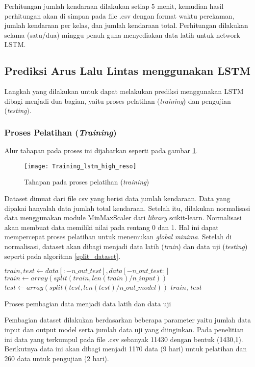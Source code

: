 \documentclass[../thesis.tex]{subfiles}
\begin{document}
Perhitungan jumlah kendaraan dilakukan setiap 5 menit, kemudian hasil perhitungan akan di simpan pada file .csv dengan format waktu perekaman, jumlah kendaraan per kelas, dan jumlah kendaraan total. Perhitungan dilakukan selama (satu/dua) minggu penuh guna menyediakan data latih untuk network LSTM.  

\subsection{Prediksi Arus Lalu Lintas menggunakan LSTM}
Langkah yang dilakukan untuk dapat melakukan prediksi menggunakan LSTM dibagi menjadi dua bagian, yaitu proses pelatihan (\textit{training}) dan pengujian (\textit{testing}).

\subsubsection{Proses Pelatihan (\textit{Training})}
Alur tahapan pada proses ini dijabarkan seperti pada gambar \ref{lstm_training}.
\begin{figure}
	\centering
	\texttt{[image: Training\_lstm\_high\_reso]}
	\caption{Tahapan pada proses pelatihan (\textit{training})}
	\label{lstm_training}
\end{figure}
Dataset dimuat dari file csv yang berisi data jumlah kendaraan. Data yang dipakai hanyalah data jumlah total kendaraan. Setelah itu, dilakukan normalisasi data menggunakan module MinMaxScaler dari \textit{library} scikit-learn. Normalisasi akan membuat data memiliki nilai pada rentang 0 dan 1. Hal ini dapat mempercepat proses pelatihan untuk menemukan \textit{global minima}.
Setelah di normalisasi, dataset akan dibagi menjadi data latih (\textit{train}) dan data uji (\textit{testing}) seperti pada algoritma \ref{split_dataset}.
\begin{algorithm}[htp]
	\begin{algorithmic}[1]
		\State $train, test \leftarrow data[:-n\_out\_test], data[-n\_out\_test:]$
		\State $train \leftarrow array(split(train, len(train)/n\_input))$
		\State $test \leftarrow array(split(test, len(test)/n\_out\_model))$
		\Return $train$, $test$
	\EndFunction
	\end{algorithmic}
	\caption{Proses pembagian data menjadi data latih dan data uji}
	\label{split_dataset}
\end{algorithm}
Pembagian dataset dilakukan berdasarkan beberapa parameter yaitu jumlah data input dan output model serta jumlah data uji yang diinginkan. Pada penelitian ini data yang terkumpul pada file .csv sebanyak 11430 dengan bentuk (1430,1). Berikutnya data ini akan dibagi menjadi 1170 data (9 hari) untuk pelatihan dan 260 data untuk pengujian (2 hari). 
\end{document}
